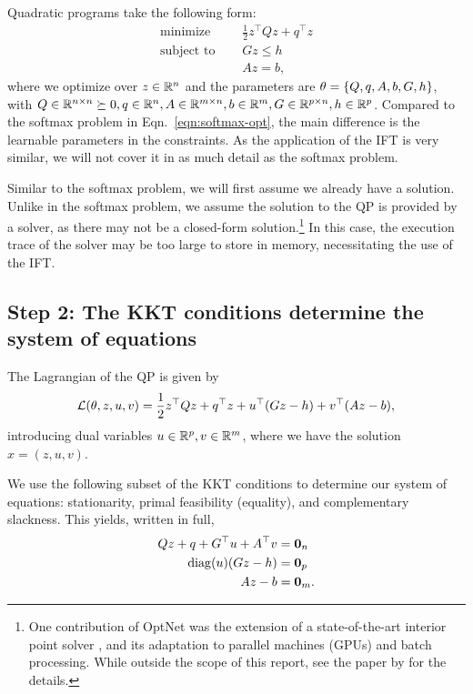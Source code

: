 \documentclass[11pt]{article}
\begin{document}
Quadratic programs take the following form:
\begin{equation}
\label{eqn:qp}
\begin{aligned}
\textrm{minimize } \quad & \frac12 z^\top Q z + q^\top z\\
\textrm{subject to } \quad
& Gz \leq h\\
& Az = b,
\end{aligned}
\end{equation}
where we optimize over $z\in\mathbb{R}^n$ and the parameters are $\theta = \left\{Q, q, A, b, G, h\right\}$,
with $Q\in\mathbb{R}^{n\times n}\succeq0, q\in\mathbb{R}^n, A\in\mathbb{R}^{m\times n},b\in\mathbb{R}^{m},G\in\mathbb{R}^{p\times n},
h\in\mathbb{R}^p$.
Compared to the softmax problem in Eqn.~\ref{eqn:softmax-opt},
the main difference is the learnable parameters in the constraints.
As the application of the IFT is very similar, we will not cover it in as much
detail as the softmax problem.

Similar to the softmax problem, we will first assume we already have a solution.
Unlike in the softmax problem, we assume the solution to the QP is provided by a solver,
as there may not be a closed-form solution.\footnote{
One contribution of OptNet was the extension of a state-of-the-art interior point
solver \citep{optnet}, and its adaptation to parallel machines (GPUs) and batch processing.
While outside the scope of this report, see the paper by \citet{optnet} for the details.
}
In this case, the execution trace of the solver may be too large to store in memory,
necessitating the use of the IFT.

\subsection*{Step 2: The KKT conditions determine the system of equations}
The Lagrangian of the QP is given by
$$
\mathcal{L}(\theta,z,u,v) = \frac12 z^\top Qz + q^\top z + u^\top(Gz-h) + v^\top(Az-b),
$$
introducing dual variables $u\in\mathbb{R}^p,v\in\mathbb{R}^m$,
where we have the solution $x = (z,u,v)$.

We use the following subset of the KKT conditions to determine our system of equations:
stationarity, primal feasibility (equality), and complementary slackness.
This yields, written in full,
\begin{equation}
\begin{aligned}
Qz + q + G^\top u + A^\top v  &= \mathbf{0}_n\\
\mathrm{diag}(u)(Gz-h) &= \mathbf{0}_p\\
Az-b &= \mathbf{0}_m.
\end{aligned}
\end{equation}
\end{document}

